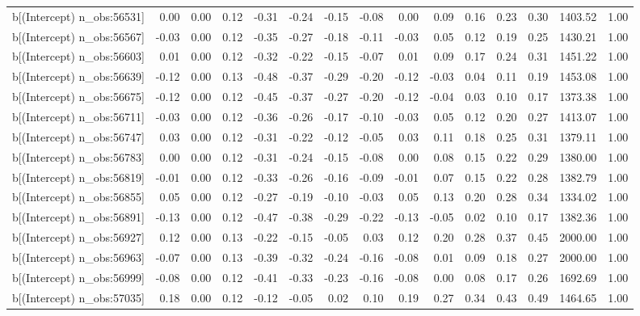 \begin{table}[ht]
\begin{tabular}{rrrrrrrrrrrrrrr}
  b[(Intercept) n\_obs:56531] & 0.00 & 0.00 & 0.12 & -0.31 & -0.24 & -0.15 & -0.08 & 0.00 & 0.09 & 0.16 & 0.23 & 0.30 & 1403.52 & 1.00 \\ 
  b[(Intercept) n\_obs:56567] & -0.03 & 0.00 & 0.12 & -0.35 & -0.27 & -0.18 & -0.11 & -0.03 & 0.05 & 0.12 & 0.19 & 0.25 & 1430.21 & 1.00 \\ 
  b[(Intercept) n\_obs:56603] & 0.01 & 0.00 & 0.12 & -0.32 & -0.22 & -0.15 & -0.07 & 0.01 & 0.09 & 0.17 & 0.24 & 0.31 & 1451.22 & 1.00 \\ 
  b[(Intercept) n\_obs:56639] & -0.12 & 0.00 & 0.13 & -0.48 & -0.37 & -0.29 & -0.20 & -0.12 & -0.03 & 0.04 & 0.11 & 0.19 & 1453.08 & 1.00 \\ 
  b[(Intercept) n\_obs:56675] & -0.12 & 0.00 & 0.12 & -0.45 & -0.37 & -0.27 & -0.20 & -0.12 & -0.04 & 0.03 & 0.10 & 0.17 & 1373.38 & 1.00 \\ 
  b[(Intercept) n\_obs:56711] & -0.03 & 0.00 & 0.12 & -0.36 & -0.26 & -0.17 & -0.10 & -0.03 & 0.05 & 0.12 & 0.20 & 0.27 & 1413.07 & 1.00 \\ 
  b[(Intercept) n\_obs:56747] & 0.03 & 0.00 & 0.12 & -0.31 & -0.22 & -0.12 & -0.05 & 0.03 & 0.11 & 0.18 & 0.25 & 0.31 & 1379.11 & 1.00 \\ 
  b[(Intercept) n\_obs:56783] & 0.00 & 0.00 & 0.12 & -0.31 & -0.24 & -0.15 & -0.08 & 0.00 & 0.08 & 0.15 & 0.22 & 0.29 & 1380.00 & 1.00 \\ 
  b[(Intercept) n\_obs:56819] & -0.01 & 0.00 & 0.12 & -0.33 & -0.26 & -0.16 & -0.09 & -0.01 & 0.07 & 0.15 & 0.22 & 0.28 & 1382.79 & 1.00 \\ 
  b[(Intercept) n\_obs:56855] & 0.05 & 0.00 & 0.12 & -0.27 & -0.19 & -0.10 & -0.03 & 0.05 & 0.13 & 0.20 & 0.28 & 0.34 & 1334.02 & 1.00 \\ 
  b[(Intercept) n\_obs:56891] & -0.13 & 0.00 & 0.12 & -0.47 & -0.38 & -0.29 & -0.22 & -0.13 & -0.05 & 0.02 & 0.10 & 0.17 & 1382.36 & 1.00 \\ 
  b[(Intercept) n\_obs:56927] & 0.12 & 0.00 & 0.13 & -0.22 & -0.15 & -0.05 & 0.03 & 0.12 & 0.20 & 0.28 & 0.37 & 0.45 & 2000.00 & 1.00 \\ 
  b[(Intercept) n\_obs:56963] & -0.07 & 0.00 & 0.13 & -0.39 & -0.32 & -0.24 & -0.16 & -0.08 & 0.01 & 0.09 & 0.18 & 0.27 & 2000.00 & 1.00 \\ 
  b[(Intercept) n\_obs:56999] & -0.08 & 0.00 & 0.12 & -0.41 & -0.33 & -0.23 & -0.16 & -0.08 & 0.00 & 0.08 & 0.17 & 0.26 & 1692.69 & 1.00 \\ 
  b[(Intercept) n\_obs:57035] & 0.18 & 0.00 & 0.12 & -0.12 & -0.05 & 0.02 & 0.10 & 0.19 & 0.27 & 0.34 & 0.43 & 0.49 & 1464.65 & 1.00 \\ 

\end{tabular}
\end{table}
